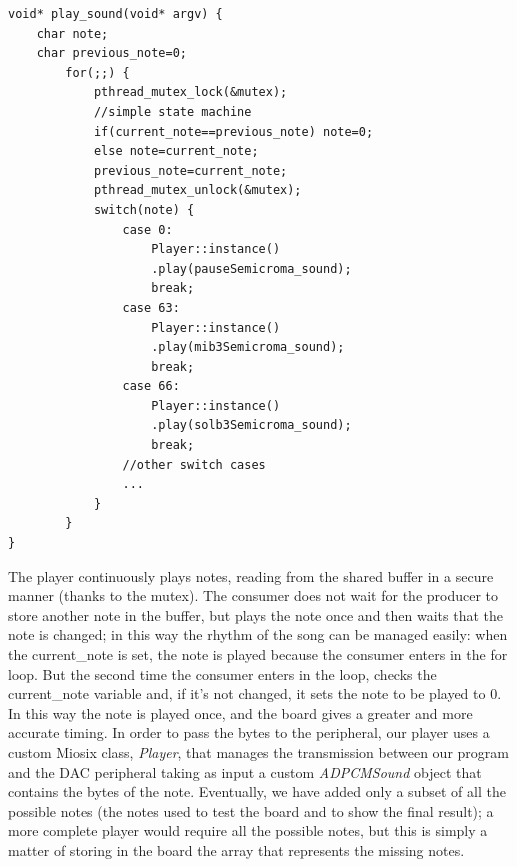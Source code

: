\documentclass[12pt]{article}
\begin{document}
\begin{lstlisting}
void* play_sound(void* argv) {
	char note;
	char previous_note=0;
		for(;;) {
			pthread_mutex_lock(&mutex);
			//simple state machine
			if(current_note==previous_note) note=0;
			else note=current_note;
			previous_note=current_note;
			pthread_mutex_unlock(&mutex);
			switch(note) {
				case 0:
					Player::instance()
					.play(pauseSemicroma_sound);
					break;
				case 63:
					Player::instance()
					.play(mib3Semicroma_sound);
					break;
				case 66:
					Player::instance()
					.play(solb3Semicroma_sound);
					break;
				//other switch cases
				...
			}
		}
}
\end{lstlisting}
The player continuously plays notes, reading from the shared buffer in a secure manner (thanks to the mutex). The consumer does not wait for the producer to store another note in the buffer, but plays the note once and then waits that the note is changed; in this way the rhythm of the song can be managed easily: when the current\_note is set, the note is played because the consumer enters in the for loop. But the second time the consumer enters in the loop, checks the current\_note variable and, if it's not changed, it sets the note to be played to 0. In this way the note is played once, and the board gives a greater and more accurate timing.\newline
In order to pass the bytes to the peripheral, our player uses a custom Miosix class, \textit{Player}, that manages the transmission between our program and the DAC peripheral taking as input a custom \textit{ADPCMSound} object that contains the bytes of the note. Eventually, we have added only a subset of all the possible notes (the notes used to test the board and to show the final result); a more complete player would require all the possible notes, but this is simply a matter of storing in the board the array that represents the missing notes.
\end{document}
